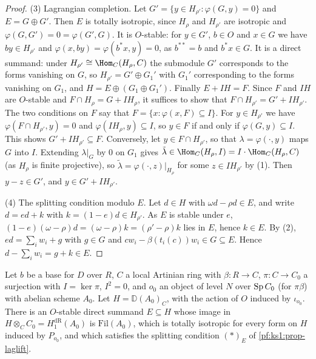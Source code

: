 \begin{proof}
(3) Lagrangian completion. Let $G'=\{y\in H_{\rho'}:\varphi(G,y)=0\}$ and $E=G\oplus G'$. Then $E$ is totally isotropic, since $H_\rho$ and $H_{\rho'}$
are isotropic and $\varphi(G,G')=0=\varphi(G',G)$. It is $O$-stable: for $y\in G'$, $b\in O$ and $x\in G$ we have $by\in H_{\rho'}$ and
$\varphi(x,by)=\varphi(b^*x,y)=0$, as $b^{**}=b$ and $b^*x\in G$. It is a direct summand: under $H_{\rho'}\cong\Hom_C(H_\rho,C)$ the submodule $G'$
corresponds to the forms vanishing on $G$, so $H_{\rho'}=G'\oplus G_1'$ with $G_1'$ corresponding to the forms vanishing on $G_1$, and
$H=E\oplus(G_1\oplus G_1')$. Finally $E+IH=F$. Since $F$ and $IH$ are $O$-stable and $F\cap H_\rho=G+IH_\rho$, it suffices to show that
$F\cap H_{\rho'}=G'+IH_{\rho'}$. The two conditions on $F$ say that $F=\{x:\varphi(x,F)\subseteq I\}$. For $y\in H_{\rho'}$ we have
$\varphi(F\cap H_{\rho'},y)=0$ and $\varphi(IH_\rho,y)\subseteq I$, so $y\in F$ if and only if $\varphi(G,y)\subseteq I$. This shows $G'+IH_{\rho'}\subseteq
F$. Conversely, let $y\in F\cap H_{\rho'}$, so that $\lambda=\varphi(\cdot,y)$ maps $G$ into $I$. Extending $\lambda|_G$ by $0$ on $G_1$ gives
$\tilde\lambda\in\Hom_C(H_\rho,I)=I\cdot\Hom_C(H_\rho,C)$ (as $H_\rho$ is finite projective), so $\tilde\lambda=\varphi(\cdot,z)|_{H_\rho}$ for some
$z\in IH_{\rho'}$ by (1). Then $y-z\in G'$, and $y\in G'+IH_{\rho'}$.

(4) The splitting condition modulo $E$. Let $d\in H$ with $\omega d-\rho d\in E$, and write $d=ed+k$ with $k=(1-e)d\in H_{\rho'}$. As $E$ is stable
under $e$, $(1-e)(\omega-\rho)d=(\omega-\rho)k=(\rho'-\rho)k$ lies in $E$, hence $k\in E$. By (2), $ed=\sum_iw_i+g$ with $g\in G$ and
$cw_i-\beta(t_i(c))w_i\in G\subseteq E$. Hence $d-\sum_iw_i=g+k\in E$.
\end{proof}

\begin{lemma}\label{pf:ks1:lem-hodgelift}
Let $b$ be a base for $D$ over $R$, $C$ a local Artinian ring with $\beta:R\to C$, $\pi:C\to C_0$ a surjection with $I=\ker\pi$, $I^2=0$, and $o_0$
an object of level $N$ over $\operatorname{Sp} C_0$ (for $\pi\beta$) with abelian scheme $A_0$. Let $H=\mathbb D(A_0)_C$, with the action of $O$ induced by
$\iota_{o_0}$. There is an $O$-stable direct summand $E\subseteq H$ whose image in $H\otimes_CC_0=H^{\mathrm{dR}}_1(A_0)$ is $\mathrm{Fil}(A_0)$, which
is totally isotropic for every form on $H$ induced by $P_{o_0}$, and which satisfies the splitting condition $(*)_E$ of
\cref{pf:ks1:prop-laglift}.
\end{lemma}

